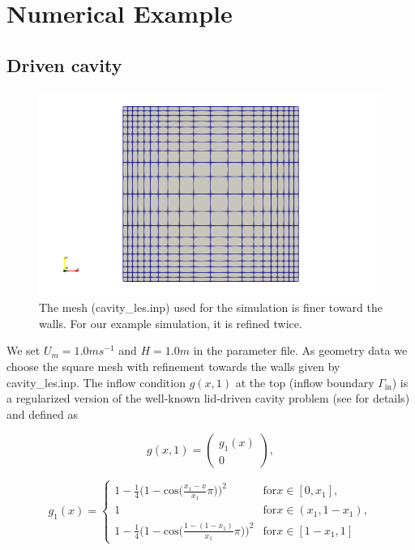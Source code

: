 \documentclass[a4paper, 11pt, twoside]{article}
\begin{document}
\section{Numerical Example}

\subsection{Driven cavity}\label{section:numresults}

\begin{figure}[!ht]
	\centering
	\includegraphics[scale=0.5]{./fig/les_mesh.png}
	\caption{The mesh (cavity\_les.inp) used for the simulation is finer toward the walls. For our example simulation, it is refined twice.}
	\label{mesh_cavity}
\end{figure}

We set $U_m = 1.0 ms^{-1}$ and $H=1.0m$ in the parameter file. As geometry data we choose the square mesh with refinement towards the walls given by cavity\_les.inp. The inflow condition $g(x,1)$ at the top (inflow boundary $\Gamma_{\text{in}}$) is a regularized version of the well-known lid-driven cavity problem (see \cite{DEFRUTOS2016368} for details) and defined as

\begin{equation}
g(x,1) = \begin{pmatrix}
         g_1(x) \\ 0
         \end{pmatrix},
\end{equation}

\begin{equation}
 g_1(x) = \begin{cases}
          1 - \frac{1}{4}\big(1-\mathrm{cos}\big(\frac{x_1-x}{x_1}\pi\big)\big)^2 & \mathrm{for } x \in [0,x_1], \\
          1 & \mathrm{for } x \in (x_1, 1-x_1), \\
          1-\frac{1}{4}\big(1-\mathrm{cos}\big(\frac{1-(1-x_1)}{x_1}\pi\big)\big)^2 & \mathrm{for } x \in [1-x_1,1]
          \end{cases}
\end{equation} 
\end{document}
